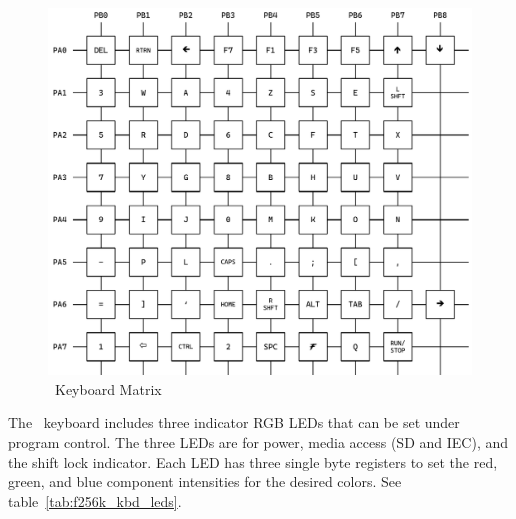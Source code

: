 \begin{figure}[ht]
    \begin{center}
        \includegraphics[scale=0.9]{images/f256k_matrix.pdf}
    \end{center}
    \caption{\fk\ Keyboard Matrix}
    \label{fig:f256k_matrix}
\end{figure}

\pagebreak[4]

The \fk\ keyboard includes three indicator RGB LEDs that can be set under program control. The three LEDs are for power, media access (SD and IEC), and the shift lock indicator. Each LED has three single byte registers to set the red, green, and blue component intensities for the desired colors. See table~\ref{tab:f256k_kbd_leds}.


